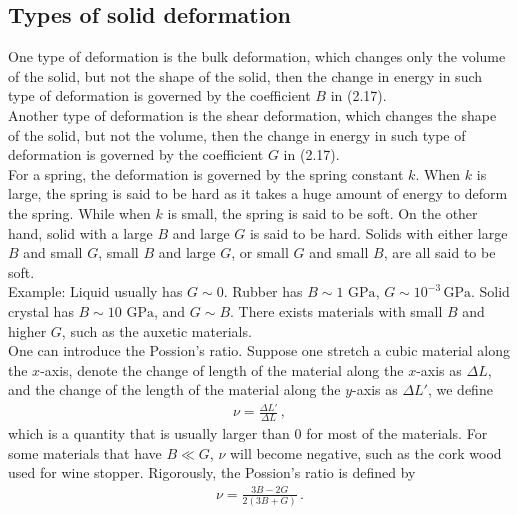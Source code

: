 \documentclass[11pt, onesided]{book}
\theoremstyle{break}
\theoremstyle{break}
\newcommand{\example}{\color{green}Example: \color{black}}
\begin{document}
\subsection{Types of solid deformation}
One type of deformation is the bulk deformation, which changes only the volume of the solid, but not the shape of the solid, then the change in energy in such type of deformation is governed by the coefficient $B$ in (2.17).\\

Another type of deformation is the shear deformation, which changes the shape of the solid, but not the volume, then the change in energy in such type of deformation is governed by the coefficient $G$ in (2.17).\\

For a spring, the deformation is governed by the spring constant $k$. When $k$ is large, the spring is said to be hard as it takes a huge amount of energy to deform the spring. While when $k$ is small, the spring is said to be soft. On the other hand, solid with a large $B$ and large $G$ is said to be hard. Solids with either large $B$ and small $G$, small $B$ and large $G$, or small $G$ and small $B$, are all said to be soft. \\

\example Liquid usually has $G\sim 0$. Rubber has $B\sim 1\text{ GPa}$, $G\sim 10^{-3}\, \text{GPa}$. Solid crystal has $B\sim 10 \text{ GPa}$, and $G\sim B$. There exists materials with small $B$ and higher $G$, such as the auxetic materials. \\

One can introduce the Possion's ratio. Suppose one stretch a cubic material along the $x$-axis, denote the change of length of the material along the $x$-axis as $\Delta L$, and the change of the length of the material along the $y$-axis as $\Delta L'$, we define
\begin{align*}
\nu = \frac{\Delta L'}{\Delta L}\,,
\end{align*}
which is a quantity that is usually larger than $0$ for most of the materials. For some materials that have $B\ll G$, $\nu$ will become negative, such as the cork wood used for wine stopper. Rigorously, the Possion's ratio is defined by
\begin{align*}
\nu = \frac{3B - 2G}{2(3B +G)}\,.
\end{align*}  
\end{document}
